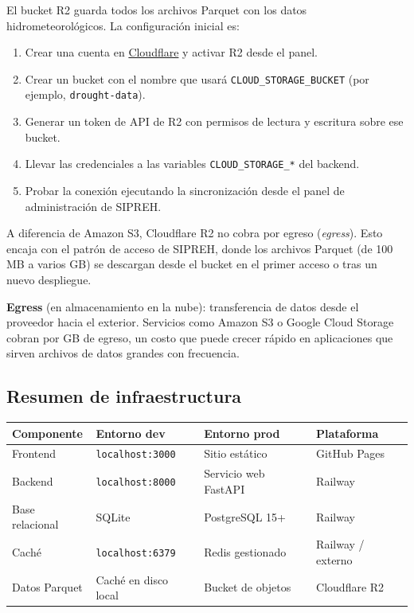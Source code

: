 El bucket R2 guarda todos los archivos Parquet con los datos hidrometeorológicos. La configuración inicial es:

\begin{enumerate}
    \item Crear una cuenta en \href{https://www.cloudflare.com/}{Cloudflare} y activar R2 desde el panel.
    \item Crear un bucket con el nombre que usará \texttt{CLOUD\_STORAGE\_BUCKET} (por ejemplo, \texttt{drought-data}).
    \item Generar un token de API de R2 con permisos de lectura y escritura sobre ese bucket.
    \item Llevar las credenciales a las variables \texttt{CLOUD\_STORAGE\_*} del backend.
    \item Probar la conexión ejecutando la sincronización desde el panel de administración de SIPREH.
\end{enumerate}

\begin{remark}
A diferencia de Amazon S3, Cloudflare R2 no cobra por egreso (\textit{egress}). Esto encaja con el patrón de acceso de SIPREH, donde los archivos Parquet (de 100 MB a varios GB) se descargan desde el bucket en el primer acceso o tras un nuevo despliegue.
\end{remark}

\begin{definition}
\textbf{Egress} (en almacenamiento en la nube): transferencia de datos desde el proveedor hacia el exterior. Servicios como Amazon S3 o Google Cloud Storage cobran por GB de egreso, un costo que puede crecer rápido en aplicaciones que sirven archivos de datos grandes con frecuencia.
\end{definition}

\subsection{Resumen de infraestructura}

\begin{center}
\begin{tabular}{@{}llll@{}}
\toprule
\textbf{Componente} & \textbf{Entorno dev} & \textbf{Entorno prod} & \textbf{Plataforma} \\
\midrule
Frontend       & \texttt{localhost:3000} & Sitio estático        & GitHub Pages \\
Backend        & \texttt{localhost:8000} & Servicio web FastAPI  & Railway \\
Base relacional& SQLite                  & PostgreSQL 15+        & Railway \\
Caché          & \texttt{localhost:6379} & Redis gestionado      & Railway / externo \\
Datos Parquet  & Caché en disco local    & Bucket de objetos     & Cloudflare R2 \\
\bottomrule
\end{tabular}
\end{center}
